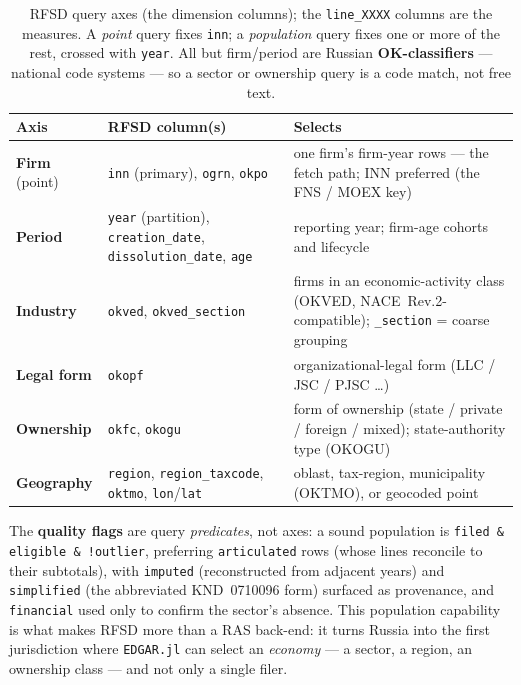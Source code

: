 \documentclass[11pt,a4paper]{report}
\begin{document}
\begin{table}[h]
\centering
\small
\caption{RFSD query axes (the dimension columns); the \texttt{line\_XXXX} columns are the measures. A
\emph{point} query fixes \texttt{inn}; a \emph{population} query fixes one or more of the rest, crossed with
\texttt{year}. All but firm/period are Russian \textbf{OK-classifiers} --- national code systems --- so a
sector or ownership query is a code match, not free text.}
\label{tab:russia-axes}
\begin{tabular}{@{}p{}p{}p{}@{}}
\toprule
\textbf{Axis} & \textbf{RFSD column(s)} & \textbf{Selects} \\
\midrule
\textbf{Firm} (point) & \texttt{inn} (primary), \texttt{ogrn}, \texttt{okpo} & one firm's firm-year rows ---
  the fetch path; INN preferred (the FNS / MOEX key) \\
\textbf{Period} & \texttt{year} (partition), \texttt{creation\_date}, \texttt{dissolution\_date},
  \texttt{age} & reporting year; firm-age cohorts and lifecycle \\
\textbf{Industry} & \texttt{okved}, \texttt{okved\_section} & firms in an economic-activity class (OKVED,
  NACE~Rev.2-compatible); \texttt{\_section} = coarse grouping \\
\textbf{Legal form} & \texttt{okopf} & organizational-legal form (LLC / JSC / PJSC \ldots) \\
\textbf{Ownership} & \texttt{okfc}, \texttt{okogu} & form of ownership (state / private / foreign / mixed);
  state-authority type (OKOGU) \\
\textbf{Geography} & \texttt{region}, \texttt{region\_taxcode}, \texttt{oktmo}, \texttt{lon}/\texttt{lat} &
  oblast, tax-region, municipality (OKTMO), or geocoded point \\
\bottomrule
\end{tabular}
\end{table}

\noindent The \textbf{quality flags} are query \emph{predicates}, not axes: a sound population is
\texttt{filed \& eligible \& !outlier}, preferring \texttt{articulated} rows (whose lines reconcile to their
subtotals), with \texttt{imputed} (reconstructed from adjacent years) and \texttt{simplified} (the abbreviated
KND~0710096 form) surfaced as provenance, and \texttt{financial} used only to confirm the sector's absence.
This population capability is what makes RFSD more than a RAS back-end: it turns Russia into the first
jurisdiction where \texttt{EDGAR.jl} can select an \emph{economy} --- a sector, a region, an ownership class
--- and not only a single filer.
\end{document}

